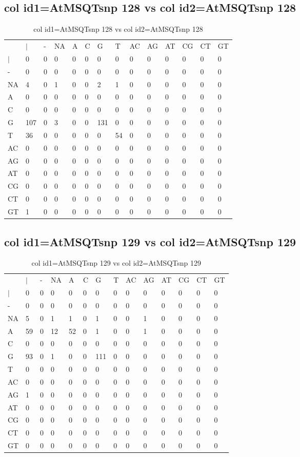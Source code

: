 \subsection{col id1=AtMSQTsnp 128 vs col id2=AtMSQTsnp 128}
\begin{center}
\begin{longtable}{|l|l|l|l|l|l|l|l|l|l|l|l|l|l|}
\caption{col id1=AtMSQTsnp 128 vs col id2=AtMSQTsnp 128} \label{table_dm704}\\
\hline
\\
\hline
&$|$&-&NA&A&C&G&T&AC&AG&AT&CG&CT&GT\\
$|$&0&0&0&0&0&0&0&0&0&0&0&0&0\\
-&0&0&0&0&0&0&0&0&0&0&0&0&0\\
NA&4&0&1&0&0&2&1&0&0&0&0&0&0\\
A&0&0&0&0&0&0&0&0&0&0&0&0&0\\
C&0&0&0&0&0&0&0&0&0&0&0&0&0\\
G&107&0&3&0&0&131&0&0&0&0&0&0&0\\
T&36&0&0&0&0&0&54&0&0&0&0&0&0\\
AC&0&0&0&0&0&0&0&0&0&0&0&0&0\\
AG&0&0&0&0&0&0&0&0&0&0&0&0&0\\
AT&0&0&0&0&0&0&0&0&0&0&0&0&0\\
CG&0&0&0&0&0&0&0&0&0&0&0&0&0\\
CT&0&0&0&0&0&0&0&0&0&0&0&0&0\\
GT&1&0&0&0&0&0&0&0&0&0&0&0&0\\
\hline
\end{longtable}
\end{center}

\subsection{col id1=AtMSQTsnp 129 vs col id2=AtMSQTsnp 129}
\begin{center}
\begin{longtable}{|l|l|l|l|l|l|l|l|l|l|l|l|l|l|}
\caption{col id1=AtMSQTsnp 129 vs col id2=AtMSQTsnp 129} \label{table_dm706}\\
\hline
\\
\hline
&$|$&-&NA&A&C&G&T&AC&AG&AT&CG&CT&GT\\
$|$&0&0&0&0&0&0&0&0&0&0&0&0&0\\
-&0&0&0&0&0&0&0&0&0&0&0&0&0\\
NA&5&0&1&1&0&1&0&0&1&0&0&0&0\\
A&59&0&12&52&0&1&0&0&1&0&0&0&0\\
C&0&0&0&0&0&0&0&0&0&0&0&0&0\\
G&93&0&1&0&0&111&0&0&0&0&0&0&0\\
T&0&0&0&0&0&0&0&0&0&0&0&0&0\\
AC&0&0&0&0&0&0&0&0&0&0&0&0&0\\
AG&1&0&0&0&0&0&0&0&0&0&0&0&0\\
AT&0&0&0&0&0&0&0&0&0&0&0&0&0\\
CG&0&0&0&0&0&0&0&0&0&0&0&0&0\\
CT&0&0&0&0&0&0&0&0&0&0&0&0&0\\
GT&0&0&0&0&0&0&0&0&0&0&0&0&0\\
\hline
\end{longtable}
\end{center}

